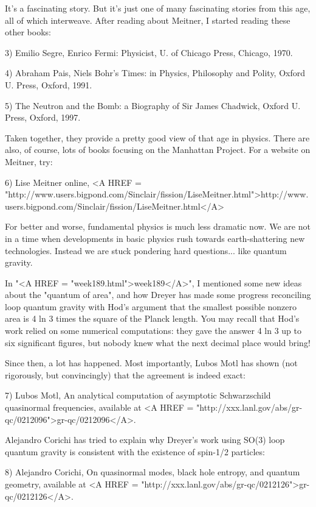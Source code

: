 It's a fascinating story.  But it's just one of many fascinating stories
from this age, all of which interweave.  After reading about Meitner, I
started reading these other books:

3) Emilio Segre, Enrico Fermi: Physicist, U. of Chicago Press, Chicago,
1970.

4) Abraham Pais, Niels Bohr's Times: in Physics, Philosophy and Polity,
Oxford U. Press, Oxford, 1991.

5) The Neutron and the Bomb: a Biography of Sir James Chadwick, Oxford
U. Press, Oxford, 1997.

Taken together, they provide a pretty good view of that age in physics.
There are also, of course, lots of books focusing on the Manhattan 
Project.   For a website on Meitner, try:

6) Lise Meitner online, <A HREF = "http://www.users.bigpond.com/Sinclair/fission/LiseMeitner.html">http://www.users.bigpond.com/Sinclair/fission/LiseMeitner.html</A>

For better and worse, fundamental physics is much less dramatic now.  We
are not in a time when developments in basic physics rush towards
earth-shattering new technologies.  Instead we are stuck pondering hard
questions... like quantum gravity.


In "<A HREF = "week189.html">week189</A>", I mentioned some
new ideas about the "quantum of area", and how Dreyer has made
some progress reconciling loop quantum gravity with Hod's argument that
the smallest possible nonzero area is 4 ln 3 times the square of the
Planck length.  You may recall that Hod's work relied on some numerical
computations: they gave the answer 4 ln 3 up to six significant figures,
but nobody knew what the next decimal place would bring!

Since then, a lot has happened.  Most importantly, Lubos Motl has shown
(not rigorously, but convincingly) that the agreement is indeed exact:

7) Lubos Motl, An analytical computation of asymptotic Schwarzschild
quasinormal frequencies, available at <A HREF = "http://xxx.lanl.gov/abs/gr-qc/0212096">gr-qc/0212096</A>.

Alejandro Corichi has tried to explain why Dreyer's work using SO(3)
loop quantum gravity is consistent with the existence of spin-1/2
particles:

8) Alejandro Corichi, On quasinormal modes, black hole entropy, and
quantum geometry, available at <A HREF = "http://xxx.lanl.gov/abs/gr-qc/0212126">gr-qc/0212126</A>.

